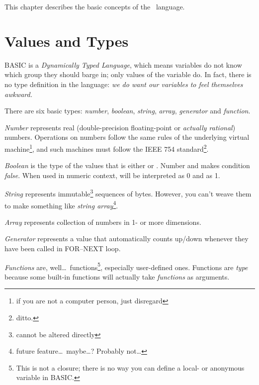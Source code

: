 \quad
{}

This chapter describes the basic concepts of the \tbas\ language.


\section{Values and Types}
\label{valuesandtypes}

BASIC is a \emph{Dynamically Typed Language}, which means variables do not know which group they should barge in; only values of the variable do. In fact, there is no type definition in the language: \emph{we do want our variables to feel themselves awkward.}

There are six basic types: \emph{number}, \emph{boolean}, \emph{string},  \emph{array}, \emph{generator} and \emph{function}.

\emph{Number} represents real (double-precision floating-point or \emph{actually rational}) numbers. Operations on numbers follow the same rules of the underlying virtual machine\footnote{if you are not a computer person, just disregard}, and such machines must follow the IEEE 754 standard\footnote{ditto.}. 

\emph{Boolean} is the type of the values that is either  or . Number  and  makes condition \emph{false}. When used in numeric context,  will be interpreted as 0 and  as 1.

\emph{String} represents immutable\footnote{cannot be altered directly} sequences of bytes. However, you can't weave them to make something like \emph{string array}\footnote{future feature\ldots\ maybe\ldots? Probably not\ldots}.

\emph{Array} represents collection of numbers in 1- or more dimensions.

\emph{Generator} represents a value that automatically counts up/down whenever they have been called in FOR--NEXT loop.

\emph{Functions} are, well\ldots\ functions\footnote{This is not a closure; there is no way you can define a local- or anonymous variable in BASIC.}, especially user-defined ones. Functions are \emph{type} because some built-in functions will actually take \emph{functions} as arguments.

